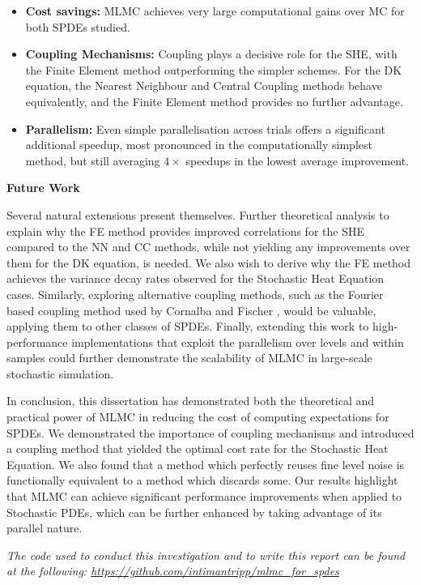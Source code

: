 \begin{itemize}
    \item \textbf{Cost savings: } MLMC achieves very large computational 
            gains over MC for both SPDEs studied.
    \item \textbf{Coupling Mechanisms: } Coupling plays a decisive role 
            for the SHE, with the Finite Element method outperforming
            the simpler schemes.
            For the DK equation, the Nearest Neighbour and Central Coupling 
            methods behave equivalently, and the Finite Element method 
            provides no further advantage.
    \item \textbf{Parallelism: } Even simple parallelisation across trials offers a significant 
            additional speedup, most pronounced in the computationally simplest method, but still
            averaging $4\times$ speedups in the lowest average improvement.
\end{itemize}

\bigskip

\textbf{Future Work}

Several natural extensions present themselves. Further theoretical 
analysis to explain why the FE method provides improved correlations 
for the SHE compared to the NN and CC methods, while not yielding any 
improvements over them for the DK equation, is needed. We also 
wish to derive why the FE method achieves the variance decay rates 
observed for the Stochastic Heat Equation cases.
Similarly, exploring alternative coupling methods, such as 
the Fourier based coupling method used by Cornalba and Fischer 
\cite{cornalba2025multilevel}, would be valuable, applying them 
to other classes of SPDEs. Finally, extending this work 
to high-performance implementations that exploit 
the parallelism over levels and within samples could 
further demonstrate the scalability of MLMC in large-scale 
stochastic simulation.

In conclusion, this dissertation has demonstrated 
both the theoretical and practical power of MLMC in reducing the 
cost of computing expectations for SPDEs. We demonstrated the 
importance of coupling mechanisms and introduced a coupling 
method that yielded the optimal cost rate for the Stochastic 
Heat Equation.
We also found that a method which perfectly 
reuses fine level noise is functionally equivalent to a 
method which discards some. Our results highlight that MLMC 
can achieve significant performance improvements when applied 
to Stochastic PDEs, which can be further enhanced by 
taking advantage of its parallel nature.

\textit{The code used to conduct this investigation and to write this report 
can be found at the following: \url{https://github.com/intimantripp/mlmc_for_spdes}}

